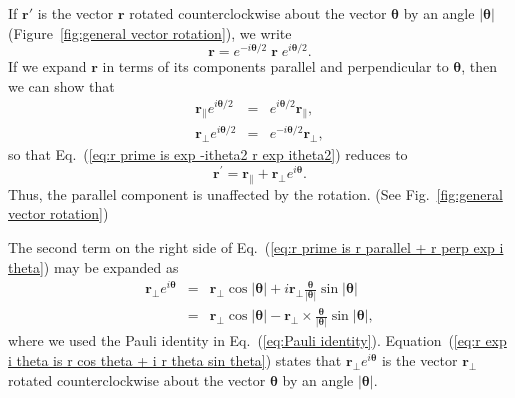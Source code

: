 \documentclass[11pt,twocolumn]{article}
\begin{document}
If $\mathbf r'$ is the vector $\mathbf r$ rotated counterclockwise about the vector ${\bm\theta}$ by an angle $|{\bm\theta}|$ (Figure~\ref{fig:general vector rotation}), we write
\begin{equation}
\label{eq:r prime is exp -itheta2 r exp itheta2}
\mathbf r=e^{-i{\bm\theta}/2}\;\mathbf r\;e^{i{\bm\theta}/2}.
\end{equation}
If we expand $\mathbf r$ in terms of its components parallel and perpendicular to $\bm\theta$, then we can show that
\begin{eqnarray}
\label{eq:r parallel exp i theta commute}
\mathbf r_\parallel e^{i{\bm\theta}/2}&=&e^{i{\bm\theta}/2}\mathbf r_\parallel,\\
\label{eq:r perp exp i theta anticommute}
\mathbf r_\perp e^{i{\bm\theta}/2}&=&e^{-i{\bm\theta}/2}\mathbf r_\perp,
\end{eqnarray}
so that Eq.~(\ref{eq:r prime is exp -itheta2 r exp itheta2}) reduces to
\begin{equation}
\label{eq:r prime is r parallel + r perp exp i theta}
\mathbf r^\prime=\mathbf r_\parallel+\mathbf r_\perp e^{i\bm\theta}.
\end{equation}
Thus, the parallel component is unaffected by the rotation.  (See Fig.~\ref{fig:general vector rotation})

The second term on the right side of Eq.~(\ref{eq:r prime is r parallel + r perp exp i theta}) may be expanded as
\begin{eqnarray}
\label{eq:r exp i theta is r cos theta + i r theta sin theta}
\mathbf r_\perp e^{i\bm\theta}&=&\mathbf r_\perp\cos|{\bm\theta}|+i\mathbf r_\perp\frac{\bm\theta}{|\bm\theta|}\sin|\bm\theta|\nonumber\\
&=&\mathbf r_\perp\cos|{\bm\theta}|-\mathbf r_\perp\times\frac{\bm\theta}{|\bm\theta|}\sin|\bm\theta|,
\end{eqnarray}
where we used the Pauli identity in Eq.~(\ref{eq:Pauli identity}).  Equation~(\ref{eq:r exp i theta is r cos theta + i r theta sin theta}) states that $\mathbf r_\perp e^{i\bm\theta}$ is the vector $\mathbf r_\perp$ rotated counterclockwise about the vector $\bm\theta$ by an angle $|\bm\theta|$.\cite{SugonMcNamara_2004_ajp72i1pp92-97_p93} 
\end{document}
